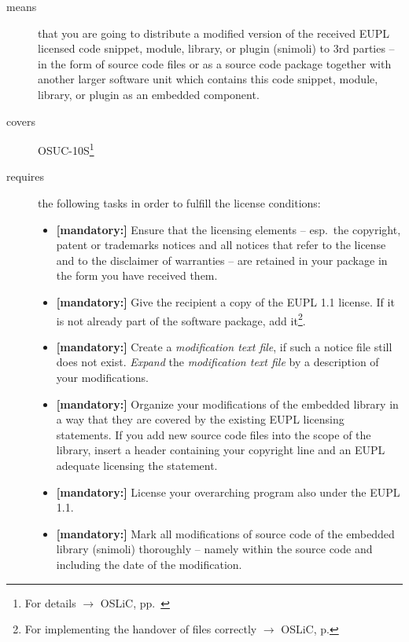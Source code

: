 \begin{description}
\item[means] that you are going to distribute a modified version of the received
EUPL licensed code snippet, module, library, or plugin (snimoli) to 3rd parties
-- in the form of source code files or as a source code package together with
another larger software unit which contains this code snippet, module, library,
or plugin as an embedded component.
\item[covers] OSUC-10S\footnote{For details $\rightarrow$ OSLiC, pp.\
\pageref{OSUC-10S-DEF}}
\item[requires] the following tasks in order to fulfill the license conditions:
\begin{itemize}

  \item \textbf{[mandatory:]} Ensure that the licensing elements -- esp.\ the
  copyright, patent or trademarks notices and all notices that refer to the
  license and to the disclaimer of warranties -- are retained in your package in
  the form you have received them.

  \item \textbf{[mandatory:]} Give the recipient a copy of the EUPL 1.1
  license. If it is not already part of the software package, add
  it\footnote{For implementing the handover of files correctly $\rightarrow$
  OSLiC, p. \pageref{DistributingFilesHint}}.

  \item \textbf{[mandatory:]} Create a \emph{modification text file}, if such a
  notice file still does not exist. \emph{Expand} the \emph{modification text
  file} by a description of your modifications.
  
  \item \textbf{[mandatory:]} Organize your modifications of the embedded
  library in a way that they are covered by the existing EUPL licensing
  statements. If you add new source code files into the scope of the library,
  insert a header containing your copyright line and an EUPL adequate licensing
  the statement.
  
  \item \textbf{[mandatory:]} License your overarching program also under the
  EUPL 1.1.
  
  \item \textbf{[mandatory:]} Mark all modifications of source code of the
  embedded library (snimoli) thoroughly -- namely within the source code and
  including the date of the modification.
  

\end{itemize}
\end{description}
